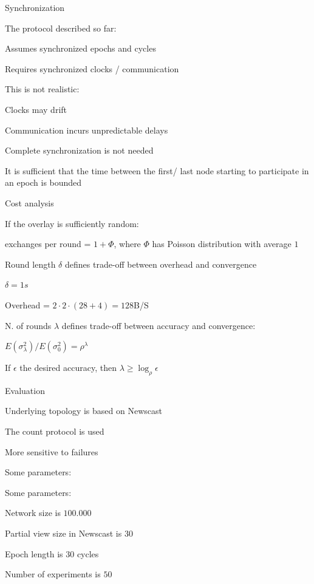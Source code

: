 \begin{frame}{Synchronization}
	
\BIL
\item The protocol described so far:
\BI
\item Assumes synchronized epochs and cycles
\item Requires synchronized clocks / communication
\EI
\item This is not realistic:
\BI
\item Clocks may drift
\item Communication incurs unpredictable delays
\EI
\item Complete synchronization is not needed
\BI
\item It is sufficient that the time between the first/ last node starting to participate in an epoch is bounded
\EI
\EIL

\end{frame}

\begin{frame}{Cost analysis}
	
\BIL
\item If the overlay is sufficiently random:
	\BI
	\item exchanges per round = $1 + \Phi$, where $\Phi$ has Poisson distribution with average $1$
	\EI
\item Round length $\delta$ defines trade-off between overhead and convergence
 	\BI
	\item $\delta = 1s$
	\item Overhead = $2 \cdot 2 \cdot (28+4) = 128$B/S
	\EI
\item N. of rounds $\lambda$ defines trade-off between accuracy and convergence:
	\BI
	\item $E(\sigma^2_\lambda )/E(\sigma_0^2) = \rho^\lambda$
	\item If $\epsilon$ the desired accuracy, then $\lambda \geq \log_\rho \epsilon$
	\EI
\EIL

\end{frame}


\begin{frame}{Evaluation}

\BIL	
\item Underlying topology is based on Newscast
\item The count protocol is used
	\BI
	\item More sensitive to failures
	\item Some parameters:
	\EI	
\item Some parameters:
	\BI
	\item Network size is $100.000$
	\item Partial view size in Newscast is $30$
	\item Epoch length is $30$ cycles
	\item Number of experiments is $50$
	\EI
\EIL
\end{frame}

